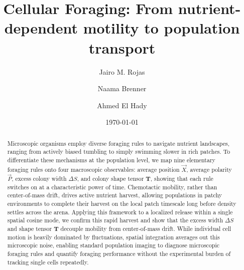 \documentclass[
  reprint,
  superscriptaddress,
  amsmath,
  amssymb,
  aps,
  pre,
  nofootinbib,
  floatfix
]{revtex4-2}
\begin{document}
\title{Cellular Foraging: From nutrient-dependent motility to population transport}

\author{Jairo M. Rojas}

\author{Naama Brenner}

\author{Ahmed El Hady}

\date{\today}

\begin{abstract}
Microscopic organisms employ diverse foraging rules to navigate nutrient landscapes, ranging from actively biased tumbling to simply swimming slower in rich patches. To differentiate these mechanisms at the population level, we map nine elementary foraging rules onto four macroscopic observables: average position $\vec{X}$, average polarity $\vec{P}$, excess colony width $\Delta S$, and colony shape tensor $\mathbf{T}$, showing that each rule switches on at a characteristic power of time. Chemotactic mobility, rather than center-of-mass drift, drives active nutrient harvest, allowing populations in patchy environments to complete their harvest on the local patch timescale long before density settles across the arena. Applying this framework to a localized release within a single spatial cosine mode, we confirm this rapid harvest and show that the excess width $\Delta S$ and shape tensor $\mathbf{T}$ decouple mobility from center-of-mass drift. While individual cell motion is heavily dominated by fluctuations, spatial integration averages out this microscopic noise, enabling standard population imaging to diagnose microscopic foraging rules and quantify foraging performance without the experimental burden of tracking single cells repeatedly.
\end{abstract}

\maketitle
\end{document}
